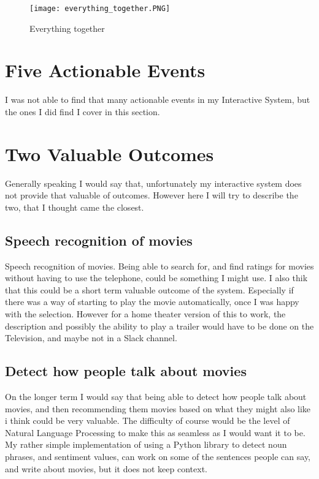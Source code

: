 \documentclass[11pt,fleqn]{book} %
\begin{document}
\begin{figure}[]
  \centering
   \texttt{[image: everything\_together.PNG]}
  \caption{Everything together}
  \label{fig:everything-together}
\end{figure}


\chapter{Five Actionable Events}
I was not able to find that many actionable events in my Interactive System, but the ones I did find I cover in this section.
\section{}


\chapter{Two Valuable Outcomes}
Generally speaking I would say that, unfortunately my interactive system does not provide that valuable of outcomes.
However here I will try to describe the two, that I thought came the closest.

\section{Speech recognition of movies}
Speech recognition of movies. Being able to search for, and find ratings for movies without having to use the telephone, could be something I might use.
I also thik that this could be a short term valuable outcome of the system. Especially if there was a way of starting to play the movie automatically, once I was happy with the selection. However for a home theater version of this to work, the description and possibly the ability to play a trailer would have to be done on the Television, and maybe not in a Slack channel.

\section{Detect how people talk about movies}
On the longer term I would say that being able to detect how people talk about movies, and then recommending them movies based on what they might also like i think could be very valuable. The difficulty of course would be the level of Natural Language Processing\cite{Wikipedia2017NaturalProcessing} to make this as seamless as I would want it to be. 
My rather simple implementation of using a Python library \cite{TextBlobTutorial:Documentation} to detect noun phrases, and sentiment values, can work on some of the sentences people can say, and write about movies, but it does not keep context. 
\end{document}
